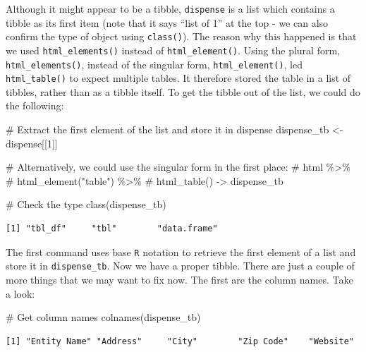 \documentclass[
  letterpaper,
]{book}
\newenvironment{Shaded}{\begin{snugshade}}{\end{snugshade}}
\newcommand{\CommentTok}[1]{\textcolor[rgb]{0.37,0.37,0.37}{#1}}
\newcommand{\DecValTok}[1]{\textcolor[rgb]{0.68,0.00,0.00}{#1}}
\newcommand{\FunctionTok}[1]{\textcolor[rgb]{0.28,0.35,0.67}{#1}}
\newcommand{\NormalTok}[1]{\textcolor[rgb]{0.00,0.23,0.31}{#1}}
\newcommand{\OtherTok}[1]{\textcolor[rgb]{0.00,0.23,0.31}{#1}}
\begin{document}
Although it might appear to be a tibble, \texttt{dispense} is a list
which contains a tibble as its first item (note that it says ``list of
1'' at the top - we can also confirm the type of object using
\texttt{class()}). The reason why this happened is that we used
\texttt{html\_elements()} instead of \texttt{html\_element()}. Using the
plural form, \texttt{html\_elements()}, instead of the singular form,
\texttt{html\_element()}, led \texttt{html\_table()} to expect multiple
tables. It therefore stored the table in a list of tibbles, rather than
as a tibble itself. To get the tibble out of the list, we could do the
following:

\begin{Shaded}
\begin{Highlighting}[]
\CommentTok{\# Extract the first element of the list and store it in dispense}
\NormalTok{dispense\_tb }\OtherTok{\textless{}{-}}\NormalTok{ dispense[[}\DecValTok{1}\NormalTok{]]}

\CommentTok{\# Alternatively, we could use the singular form in the first place:}
\CommentTok{\# html \%\textgreater{}\%}
\CommentTok{\#  html\_element("table") \%\textgreater{}\%}
\CommentTok{\#  html\_table() {-}\textgreater{} dispense\_tb}

\CommentTok{\# Check the type}
\FunctionTok{class}\NormalTok{(dispense\_tb)}
\end{Highlighting}
\end{Shaded}

\begin{verbatim}
[1] "tbl_df"     "tbl"        "data.frame"
\end{verbatim}

The first command uses base \texttt{R} notation to retrieve the first
element of a list and store it in \texttt{dispense\_tb}. Now we have a
proper tibble. There are just a couple of more things that we may want
to fix now. The first are the column names. Take a look:

\begin{Shaded}
\begin{Highlighting}[]
\CommentTok{\# Get column names}
\FunctionTok{colnames}\NormalTok{(dispense\_tb)}
\end{Highlighting}
\end{Shaded}

\begin{verbatim}
[1] "Entity Name" "Address"     "City"        "Zip Code"    "Website"    
\end{verbatim}
\end{document}
